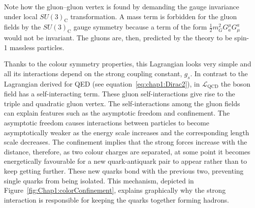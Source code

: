 

Note how the gluon--gluon vertex is found by demanding the gauge invariance under local $SU(3)_\text{C}$ transformation.
A mass term is forbidden for the gluon fields by the $SU(3)_\text{C}$  gauge symmetry because a term of the form 
$\frac{1}{2}m^{2}_{G}G^{\mu}_{a}G_{\mu}^{a}$ would not be invariant.
The gluons are, then, predicted by the theory to be spin-1 massless particles.

Thanks to the colour symmetry properties, this Lagrangian looks very simple and all its interactions depend on the strong coupling
constant, $g_s$. In contrast to the Lagrangian derived for QED (see equation~\ref{eq:chap1:Dirac2}), 
in $\mathcal{L}_{\text{QCD}}$ the boson field 
has a self-interacting term. These gluon self-interactions give rise to the triple and quadratic gluon vertex.
The self-interactions among the gluon fields can explain features such as the asymptotic freedom and confinement.
The asymptotic freedom causes interactions between particles to become asymptotically weaker as the energy 
scale increases and the corresponding length scale decreases. 
The confinement implies that the strong forces increase with the distance, therefore, 
as two colour charges are separated, at some point it becomes energetically favourable 
for a new quark-antiquark pair to appear rather than to keep getting further. These new quarks 
bond with the previous two, preventing single quarks from being isolated. This mechanism, 
depicted in Figure~\ref{fig:Chap1:colorConfinement}, explains graphically why the strong 
interaction is responsible for keeping the quarks together forming hadrons.

